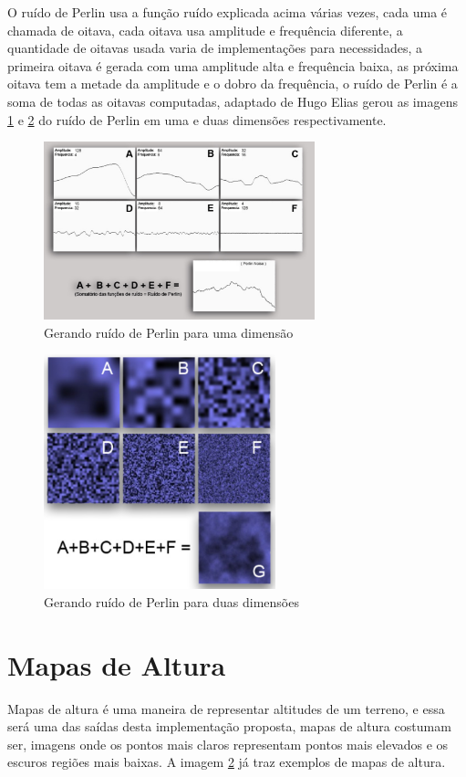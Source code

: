O ruído de Perlin usa a função ruído explicada acima várias vezes, cada uma é chamada
de oitava, cada oitava usa amplitude e frequência diferente, a quantidade de oitavas
usada varia de implementações para necessidades, a primeira oitava é gerada com uma
amplitude alta e frequência baixa, as próxima oitava tem a metade da amplitude e 
o dobro da frequência, o ruído de Perlin é a soma de todas as oitavas computadas,
adaptado de Hugo Elias \cite{carli2012canion} gerou as imagens
\ref{fig:perlin1d} e \ref{fig:perlin2d} do ruído de Perlin em uma e duas
dimensões respectivamente.
\begin{figure}[H]
    \centering
    \includegraphics[width=0.7\textwidth]{figuras/perlin1d.png}
    \caption{Gerando ruído de Perlin para uma dimensão}
    \label{fig:perlin1d}
\end{figure}
\begin{figure}[H]
    \centering
    \includegraphics[width=0.6\textwidth]{figuras/perlin2d.png}
    \caption{Gerando ruído de Perlin para duas dimensões}
    \label{fig:perlin2d}
\end{figure}

\section{Mapas de Altura}
Mapas de altura é uma maneira de representar altitudes de um terreno, e essa
será uma das saídas desta implementação proposta, mapas de altura costumam ser, imagens
onde os pontos mais claros representam pontos mais elevados e os escuros regiões mais baixas.
A imagem \ref{fig:perlin2d} já traz exemplos de mapas de altura.

